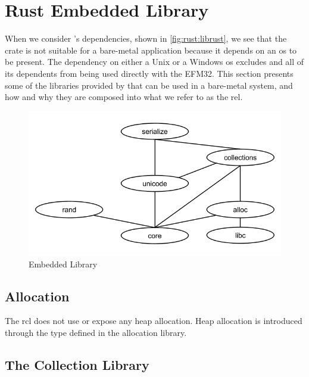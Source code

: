 \section{Rust Embedded Library}
\label{sec:rust_embedded_library}

When we consider {\std}'s dependencies, shown in \autoref{fig:rust:librust}, we see that the crate is not suitable for a bare-metal application because it depends on an \gls{os} to be present.
The dependency on either a Unix or a Windows \gls{os} excludes {\std} and all of its dependents from being used directly with the EFM32.
This section presents some of the libraries provided by {\rust} that can be used in a bare-metal system, and how and why they are composed into what we refer to as the \gls{rel}.

\begin{figure}[H]
  \begin{center}
    \includegraphics[scale=0.3]{figures/background/rust/embedded-rust-lib.png}
  \end{center}
  \caption{\rust Embedded Library}
  \label{fig:rust:rel}
\end{figure}

\subsection{Allocation}
\label{sec:rust:allocation}

The \gls{rcl} does not use or expose any heap allocation.
Heap allocation is introduced through the  type defined in the allocation library.

\subsection{The Collection Library}

